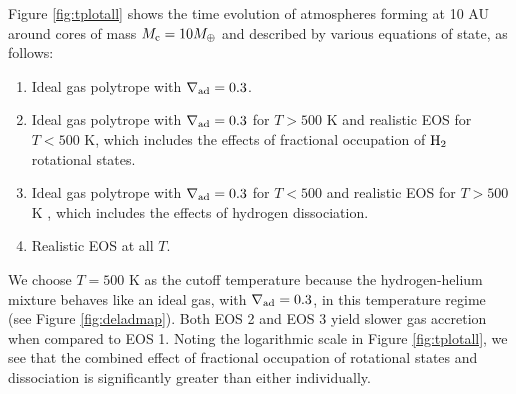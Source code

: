 \documentclass[apj]{emulateapj}
\newcommand{\delad}{\nabla_{\rm ad}}
\newcommand{\co}{_{\rm c}}
\begin{document}
Figure \ref{fig:tplotall} shows the time evolution of atmospheres forming at 10 AU around cores of mass $M\co=10 M_{\oplus}$ and described by various equations of state, as follows:
\begin{enumerate}
\item Ideal gas polytrope with $\delad=0.3$. %
\item Ideal gas polytrope with $\delad=0.3$ for $T>500$ K and realistic EOS for $T<500$ K, which includes the effects of fractional occupation of $\rm H_2$ rotational states.
\item Ideal gas polytrope with $\delad=0.3$ for $T<500$ and realistic EOS for $T>500$ K , which includes the effects of hydrogen dissociation.
\item Realistic EOS at all $T$. 
\end{enumerate}
We choose $T=500$ K as the cutoff temperature because the hydrogen-helium mixture behaves like an ideal gas, with $\delad=0.3$, in this temperature regime (see Figure \ref{fig:deladmap}). 
Both EOS 2 and EOS 3 yield slower gas accretion when compared to EOS 1. Noting the logarithmic scale in Figure \ref{fig:tplotall}, we see that the combined effect of fractional occupation of rotational states and dissociation is significantly greater than either individually. 

  
\end{document}
